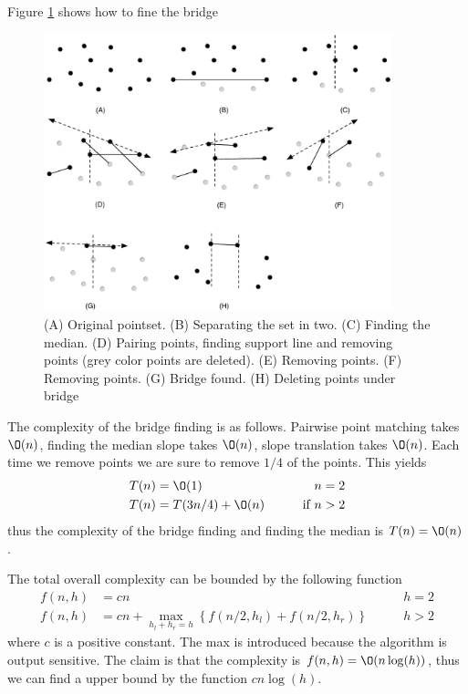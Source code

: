 \documentclass[10pt]{article}
\begin{document}
Figure \ref{fig19} shows how to fine the bridge

\begin{figure}[ht]
\centering
\includegraphics[width=0.9\textwidth]{figures/fig19.pdf}
\caption{(A) Original pointset. (B) Separating the set in two. (C) Finding the median. (D) Pairing points, finding support line and removing points (grey color points are deleted). (E) Removing points. (F) Removing points. (G) Bridge found. (H) Deleting points under bridge}
\label{fig19}
\end{figure}

The complexity of the bridge finding is as follows. Pairwise point matching takes $\O(n)$, finding the median slope takes $\O(n)$, slope translation takes $\O(n)$. Each time we remove points we are sure to remove $1/4$ of the points. This yields 
\begin{align*}
T(n) &= \O(1) &\qquad n=2\\ 
T(n) &= T(3n/4) + \O(n) &\qquad \text{if } n>2
\end{align*}
thus the complexity of the bridge finding and finding the median is $T(n)=\O(n)$.

The total overall complexity can be bounded by the following function
\begin{align*}
f(n,h) &= cn &\qquad h=2  \\ 
f(n,h) &= cn + \max_{h_l+h_r = h}\left\{f(n/2,h_l)+f(n/2,h_r)\right\} &\qquad h>2
\end{align*}
where $c$ is a positive constant. The max is introduced because the algorithm is output sensitive. The claim is that the complexity is $f(n,h) = \O(n\log(h))$, thus we can find a upper bound by the function $cn\log(h)$.
\end{document}
